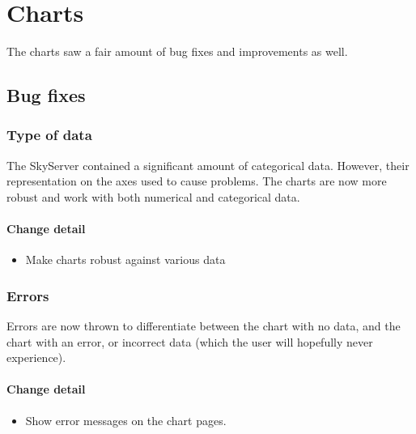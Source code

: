 \section{Charts}
The charts saw a fair amount of bug fixes and improvements as well.


\subsection{Bug fixes}
  \subsubsection{Type of data}
  The SkyServer contained a significant amount of categorical data. However, their representation on the axes
  used to cause problems. The charts are now more robust and work with both numerical and categorical data.
  
 \paragraph{Change detail}
\begin{itemize}
  \item Make charts robust against various data
\end{itemize}
  
 \subsubsection{Errors}
  Errors are now thrown to differentiate between the chart with no data, and the chart with an error,
  or incorrect data (which the user will hopefully never experience). 
  
   \paragraph{Change detail}
\begin{itemize}
  \item Show error messages on the chart pages.
\end{itemize}
  
